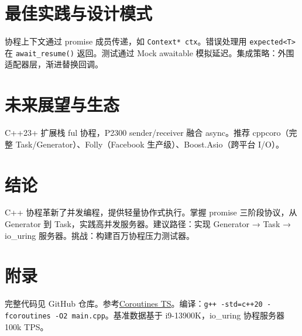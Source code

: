 \chapter{最佳实践与设计模式}
协程上下文通过 promise 成员传递，如 \texttt{Context* ctx}。错误处理用 \texttt{expected<T>} 在 \texttt{await\_{}resume()} 返回。测试通过 Mock awaitable 模拟延迟。集成策略：外围适配器层，渐进替换回调。\par
\chapter{未来展望与生态}
C++23+ 扩展栈 ful 协程，P2300 sender/receiver 融合 async。推荐 cppcoro（完整 Task/Generator）、Folly（Facebook 生产级）、Boost.Asio（跨平台 I/O）。\par
\chapter{结论}
C++ 协程革新了并发编程，提供轻量协作式执行。掌握 promise 三阶段协议，从 Generator 到 Task，实践高并发服务器。建议路径：实现 Generator → Task → io\_{}uring 服务器。挑战：构建百万协程压力测试器。\par
\chapter{附录}
完整代码见 GitHub 仓库。参考\href{https://wg21.link/P1063R6}{Coroutines TS}。编译：\texttt{g++ -std=c++20 -fcoroutines -O2 main.cpp}。基准数据基于 i9-13900K，io\_{}uring 协程服务器 100k TPS。\par

